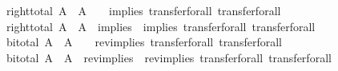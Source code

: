 \begin{isabellebody}
\ \ {\isachardoublequoteopen}right{\isacharunderscore}{\kern0pt}total\ A\ {\isasymLongrightarrow}\ {\isacharparenleft}{\kern0pt}{\isacharparenleft}{\kern0pt}A\ {\isacharequal}{\kern0pt}{\isacharequal}{\kern0pt}{\isacharequal}{\kern0pt}{\isachargreater}{\kern0pt}\ {\isacharparenleft}{\kern0pt}{\isacharequal}{\kern0pt}{\isacharparenright}{\kern0pt}{\isacharparenright}{\kern0pt}\ {\isacharequal}{\kern0pt}{\isacharequal}{\kern0pt}{\isacharequal}{\kern0pt}{\isachargreater}{\kern0pt}\ implies{\isacharparenright}{\kern0pt}\ transfer{\isacharunderscore}{\kern0pt}forall\ transfer{\isacharunderscore}{\kern0pt}forall{\isachardoublequoteclose}\isanewline
\ \ {\isachardoublequoteopen}right{\isacharunderscore}{\kern0pt}total\ A\ {\isasymLongrightarrow}\ {\isacharparenleft}{\kern0pt}{\isacharparenleft}{\kern0pt}A\ {\isacharequal}{\kern0pt}{\isacharequal}{\kern0pt}{\isacharequal}{\kern0pt}{\isachargreater}{\kern0pt}\ implies{\isacharparenright}{\kern0pt}\ {\isacharequal}{\kern0pt}{\isacharequal}{\kern0pt}{\isacharequal}{\kern0pt}{\isachargreater}{\kern0pt}\ implies{\isacharparenright}{\kern0pt}\ transfer{\isacharunderscore}{\kern0pt}forall\ transfer{\isacharunderscore}{\kern0pt}forall{\isachardoublequoteclose}\isanewline
\ \ {\isachardoublequoteopen}bi{\isacharunderscore}{\kern0pt}total\ A\ {\isasymLongrightarrow}\ {\isacharparenleft}{\kern0pt}{\isacharparenleft}{\kern0pt}A\ {\isacharequal}{\kern0pt}{\isacharequal}{\kern0pt}{\isacharequal}{\kern0pt}{\isachargreater}{\kern0pt}\ {\isacharparenleft}{\kern0pt}{\isacharequal}{\kern0pt}{\isacharparenright}{\kern0pt}{\isacharparenright}{\kern0pt}\ {\isacharequal}{\kern0pt}{\isacharequal}{\kern0pt}{\isacharequal}{\kern0pt}{\isachargreater}{\kern0pt}\ rev{\isacharunderscore}{\kern0pt}implies{\isacharparenright}{\kern0pt}\ transfer{\isacharunderscore}{\kern0pt}forall\ transfer{\isacharunderscore}{\kern0pt}forall{\isachardoublequoteclose}\isanewline
\ \ {\isachardoublequoteopen}bi{\isacharunderscore}{\kern0pt}total\ A\ {\isasymLongrightarrow}\ {\isacharparenleft}{\kern0pt}{\isacharparenleft}{\kern0pt}A\ {\isacharequal}{\kern0pt}{\isacharequal}{\kern0pt}{\isacharequal}{\kern0pt}{\isachargreater}{\kern0pt}\ rev{\isacharunderscore}{\kern0pt}implies{\isacharparenright}{\kern0pt}\ {\isacharequal}{\kern0pt}{\isacharequal}{\kern0pt}{\isacharequal}{\kern0pt}{\isachargreater}{\kern0pt}\ rev{\isacharunderscore}{\kern0pt}implies{\isacharparenright}{\kern0pt}\ transfer{\isacharunderscore}{\kern0pt}forall\ transfer{\isacharunderscore}{\kern0pt}forall{\isachardoublequoteclose}\isanewline
%
\isadelimproof
\ \ %
\endisadelimproof
%
\isatagproof
{}\isamarkupfalse%

\end{isabellebody}
